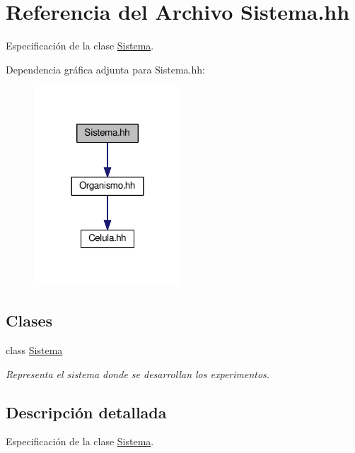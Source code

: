 \hypertarget{_sistema_8hh}{}\section{Referencia del Archivo Sistema.\+hh}
\label{_sistema_8hh}


Especificación de la clase \hyperlink{class_sistema}{Sistema}.  


Dependencia gráfica adjunta para Sistema.\+hh\+:
\nopagebreak
\begin{figure}[H]
\begin{center}
\leavevmode
\includegraphics[width=156pt]{_sistema_8hh__incl}
\end{center}
\end{figure}
\subsection*{Clases}
\begin{DoxyCompactItemize}
\item 
class \hyperlink{class_sistema}{Sistema}
\begin{DoxyCompactList}\small\item\em Representa el sistema donde se desarrollan los experimentos. \end{DoxyCompactList}\end{DoxyCompactItemize}


\subsection{Descripción detallada}
Especificación de la clase \hyperlink{class_sistema}{Sistema}. 

